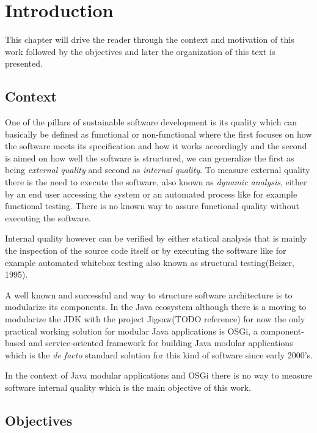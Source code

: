 \chapter{Introduction}
 This chapter will drive the reader through the context and motivation of this work followed by the objectives and later the organization of this text is presented.  
 

\section{Context}

One of the pillars of sustainable software development is its quality which can basically be defined as functional or non-functional where the first focuses on how the software meets its specification and how it works accordingly and the second is aimed on how well the software is structured, we can generalize the first as being \emph{external quality} and second as \emph{internal quality}. To measure external quality there is the need to execute the software, also known as \emph{dynamic analysis}, either by an end user accessing the system or an automated process like for example functional testing. There is no known way to assure functional quality without executing the software. 

Internal quality however can be verified by either statical analysis that is mainly the inspection of the source code itself or by executing the software like for example automated whitebox testing also known as structural testing(Beizer, 1995).   

A well known and successful and way to structure software architecture is to modularize its components. In the Java ecosystem although there is a moving to modularize the JDK with the project Jigsaw(TODO reference) for now the only practical working solution for modular Java applications is OSGi, a component-based and service-oriented framework for building Java modular applications which is the \emph{de facto} standard solution for this kind of software since early 2000's. 

In the context of Java modular applications and OSGi there is no way to measure software internal quality which is the main objective of this work.          


\section{Objectives}

